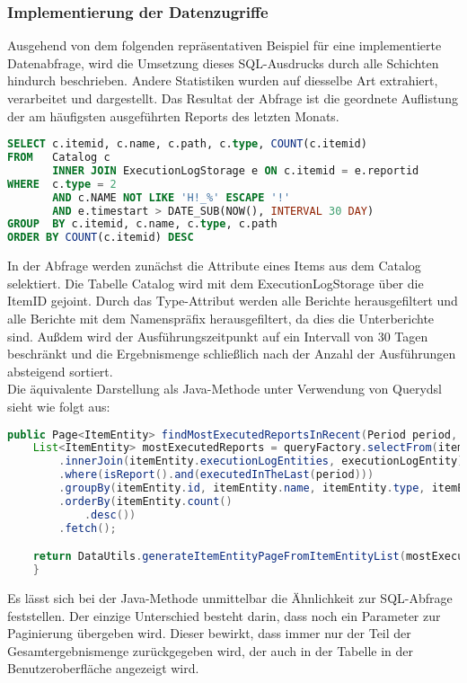 \subsubsection{Implementierung der Datenzugriffe}
\label{sec:ImplementierungDatenzugriffe}
Ausgehend von dem folgenden repräsentativen Beispiel für eine implementierte Datenabfrage, wird die Umsetzung dieses SQL-Ausdrucks durch alle Schichten hindurch beschrieben. Andere Statistiken wurden auf diesselbe Art extrahiert, verarbeitet und dargestellt. Das Resultat der Abfrage ist die geordnete Auflistung der am häufigsten ausgeführten Reports des letzten Monats.
\begin{lstlisting}[language=SQL,caption={SQL-Abfrage}]
SELECT c.itemid, c.name, c.path, c.type, COUNT(c.itemid)
FROM   Catalog c 
       INNER JOIN ExecutionLogStorage e ON c.itemid = e.reportid 
WHERE  c.type = 2
       AND c.NAME NOT LIKE 'H!_%' ESCAPE '!'
       AND e.timestart > DATE_SUB(NOW(), INTERVAL 30 DAY)
GROUP  BY c.itemid, c.name, c.type, c.path 
ORDER BY COUNT(c.itemid) DESC
\end{lstlisting}
In der Abfrage werden zunächst die Attribute eines Items aus dem Catalog selektiert. Die Tabelle Catalog wird mit dem ExecutionLogStorage über die ItemID gejoint. Durch das Type-Attribut werden alle Berichte herausgefiltert und alle Berichte mit dem Namenspräfix  herausgefiltert, da dies die Unterberichte sind. Außdem wird der Ausführungszeitpunkt auf ein Intervall von 30 Tagen beschränkt und die Ergebnismenge schließlich nach der Anzahl der Ausführungen absteigend sortiert.\\
Die äquivalente Darstellung als Java-Methode unter Verwendung von Querydsl sieht wie folgt aus:
\begin{lstlisting}[language=Java,caption={Querydsl},label=l:querydsl]
	public Page<ItemEntity> findMostExecutedReportsInRecent(Period period, Pageable pageable) {
    List<ItemEntity> mostExecutedReports = queryFactory.selectFrom(itemEntity)
        .innerJoin(itemEntity.executionLogEntities, executionLogEntity)
        .where(isReport().and(executedInTheLast(period)))
        .groupBy(itemEntity.id, itemEntity.name, itemEntity.type, itemEntity.path)
        .orderBy(itemEntity.count()
            .desc())
        .fetch();

    return DataUtils.generateItemEntityPageFromItemEntityList(mostExecutedReports, pageable);
  	}
\end{lstlisting}
Es lässt sich bei der Java-Methode unmittelbar die Ähnlichkeit zur SQL-Abfrage feststellen. Der einzige Unterschied besteht darin, dass noch ein Parameter zur Paginierung übergeben wird. Dieser bewirkt, dass immer nur der Teil der Gesamtergebnismenge zurückgegeben wird, der auch in der Tabelle in der Benutzeroberfläche angezeigt wird.

